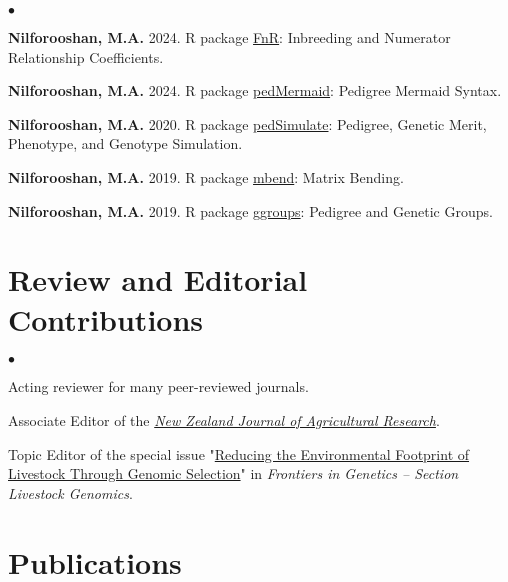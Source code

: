 \documentclass[margin,line]{res}
\newenvironment{list2}{
  \begin{list}{$\bullet$}{%
      \setlength{\itemsep}{0in}
      \setlength{\parsep}{0in} \setlength{\parskip}{0in}
      \setlength{\topsep}{0in} \setlength{\partopsep}{0in}
      \setlength{\leftmargin}{0.2in}}}{\end{list}}
\begin{document}
\begin{resume}
  \begin{list2}
    \item {\bf Nilforooshan, M.A.} 2024. R package \href{https://CRAN.R-project.org/package=FnR}{FnR}: Inbreeding and Numerator Relationship Coefficients. \\
    \item {\bf Nilforooshan, M.A.} 2024. R package \href{https://CRAN.R-project.org/package=pedMermaid}{pedMermaid}: Pedigree Mermaid Syntax. \\
    \item {\bf Nilforooshan, M.A.} 2020. R package \href{https://CRAN.R-project.org/package=pedSimulate}{pedSimulate}: Pedigree, Genetic Merit, Phenotype, and Genotype Simulation. \\
    \item {\bf Nilforooshan, M.A.} 2019. R package \href{https://CRAN.R-project.org/package=mbend}{mbend}: Matrix Bending. \\
    \item {\bf Nilforooshan, M.A.} 2019. R package \href{https://CRAN.R-project.org/package=ggroups}{ggroups}: Pedigree and Genetic Groups.
  \end{list2}
  \section{\sc Review and Editorial Contributions}

  \begin{list2}
    \item Acting reviewer for many peer-reviewed journals.
    \item Associate Editor of the \textit{\href{https://www.tandfonline.com/journals/tnza20}{New Zealand Journal of Agricultural Research}}.
    \item Topic Editor of the special issue "\href{https://www.frontiersin.org/research-topics/24065/reducing-the-environmental-footprint-of-livestock-through-genomic-selection}{Reducing the Environmental Footprint of Livestock Through Genomic Selection}" in \textit{Frontiers in Genetics -- Section Livestock Genomics}.
  \end{list2}
  \section{\sc Publications}


\end{resume}
\end{document}
